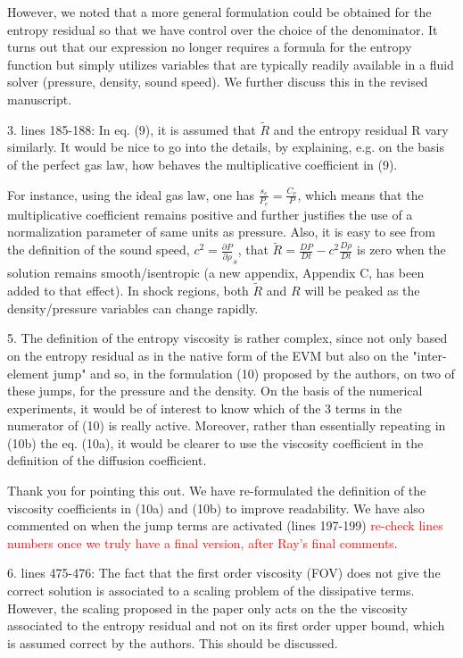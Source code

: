 \documentclass{article}
\newcommand{\tcr}[1]{\textcolor{red}{#1}}
\begin{document}
However, we noted that a more general formulation could be obtained for the entropy residual so that we have control over the choice of the denominator. It turns out that our expression no longer requires a formula for the entropy function but simply utilizes variables that are typically readily available in a fluid solver (pressure, density, sound speed). We further discuss this in the revised manuscript. 
\bigskip


{
\color{blue}
3. lines 185-188: In eq. (9), it is assumed that $\tilde{R}$ and the entropy residual R vary similarly. It would be nice to go into the details, by explaining, e.g. on the basis of the perfect gas law, how behaves the multiplicative coefficient in (9). 
}

For instance, using the ideal gas law, one has $\frac{s_e}{P_e} = \frac{C_v}{P}$,  which means that the multiplicative coefficient remains positive and further justifies the use of a normalization parameter of same units as pressure. Also, it is easy to see from the definition of the sound speed, $c^2 = \frac{\partial P}{\partial \rho}_s$, that $\tilde{R} = \frac{DP}{Dt}-c^2 \frac{D\rho}{Dt}$ is zero when the solution remains smooth/isentropic (a new appendix, Appendix C, has been added to that effect). In shock regions, both $\tilde{R}$ and $R$ will be peaked as the density/pressure variables can change rapidly.
\bigskip


{
\color{blue}
5. The definition of the entropy viscosity is rather complex, since not only based on  the entropy residual as in the native form of the EVM but also on  the "inter-element jump" and so, in the formulation (10) proposed by the authors, on two of these jumps, for the pressure and the density. On the basis of the numerical experiments, it  would be of interest to know which of the 3 terms in the numerator of (10) is really active.  Moreover, rather than essentially repeating in (10b) the eq. (10a), it would be clearer to use the viscosity coefficient in the definition of the diffusion coefficient.
}

Thank you for pointing this out. We have re-formulated the definition of the viscosity coefficients in (10a) and (10b) to improve readability. We have also commented on when the jump terms are activated (lines 197-199) \tcr{re-check lines numbers once we truly have a final version, after Ray's final comments}.
\bigskip


{
\color{blue}
6. lines 475-476: The fact that the first order viscosity (FOV)  does not give the correct solution is associated to a scaling problem of the dissipative terms. However, the scaling proposed in the paper only acts on the the viscosity associated to the entropy residual and not on its first order upper bound, which is assumed correct by the authors. This should be discussed.
}
\end{document}
